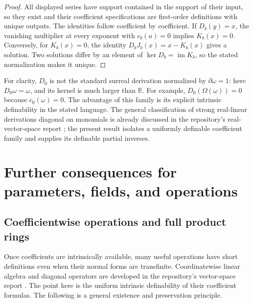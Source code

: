 \documentclass[11pt,a4paper]{article}
\numberwithin{equation}{section}
\theoremstyle{definition}
\theoremstyle{remark}
\begin{document}
\begin{proof}
All displayed series have support contained in the support of their
input, so they exist and their coefficient specifications are first-order
definitions with unique outputs.  The identities follow coefficient by
coefficient.  If $D_b(y)=x$, the vanishing multiplier at every exponent
with $c_b(a)=0$ implies $K_b(x)=0$.  Conversely, for $K_b(x)=0$, the
identity $D_bJ_b(x)=x-K_b(x)$ gives a solution.  Two solutions differ by an
element of $\ker D_b=\operatorname{im}K_b$, so the stated normalization
makes it unique.
\end{proof}

For clarity, $D_0$ is not the standard surreal derivation normalized by
$\partial\omega=1$: here $D_0\omega=\omega$, and its kernel is much
larger than $\mathbb R$.  For example,
$D_0(\Omega(\omega))=0$ because $c_0(\omega)=0$.  The advantage of this
family is its explicit intrinsic definability in the stated language.
The general classification of strong real-linear derivations diagonal on
monomials is already discussed in the repository's real-vector-space
report \cite{RepoRvs}; the present result isolates a uniformly definable coefficient
family and supplies its definable partial inverses.

\section{Further consequences for parameters, fields, and operations}
\label{dsn:op:sec:consequences}

\subsection{Coefficientwise operations and full product rings}

Once coefficients are intrinsically available, many useful operations
have short definitions even when their normal forms are transfinite.
Coordinatewise linear algebra and diagonal operators are developed in
the repository's vector-space report \cite{RepoRvs}.  The point here
is the uniform intrinsic definability of their coefficient formulas.
The following is a general existence and preservation principle.
\end{document}
